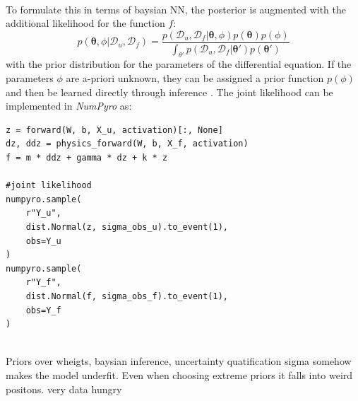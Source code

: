 \documentclass{article}
\begin{document}
\\
To formulate this in terms of baysian NN, the posterior is augmented with the additional likelihood for the function $f$:
\begin{equation} \label{eq:post_params_BPINN}
    p(\bm \theta, \phi|\mathcal{D}_u, \mathcal{D}_f) = \frac{p(\mathcal{D}_u, \mathcal{D}_f|\bm \theta, \phi)p(\bm \theta)p(\phi)}{\int_{\theta'}p(\mathcal{D}_u, \mathcal{D}_f|\bm \theta')p(\bm \theta')}
\end{equation}
with the prior distribution for the parameters of the differential equation. If the parameters $\phi$ are a-priori unknown, they can be assigned a prior function $p(\phi)$ and then be learned directly through inference \cite{raissi2017physicsIDL, Yang_2021}.
The joint likelihood can be implemented in \textit{NumPyro} as:
\begin{lstlisting}[caption={Joint likelihood for B-PINN},captionpos=t]
z = forward(W, b, X_u, activation)[:, None]
dz, ddz = physics_forward(W, b, X_f, activation)
f = m * ddz + gamma * dz + k * z

#joint likelihood
numpyro.sample(
    r"Y_u", 
    dist.Normal(z, sigma_obs_u).to_event(1), 
    obs=Y_u
)
numpyro.sample(
    r"Y_f", 
    dist.Normal(f, sigma_obs_f).to_event(1), 
    obs=Y_f
)
\end{lstlisting} 


\\
    
Priors over wheigts, baysian inference, uncertainty quatification sigma somehow makes the model underfit. Even when choosing extreme priors it falls into weird positons. very data hungry
\end{document}
